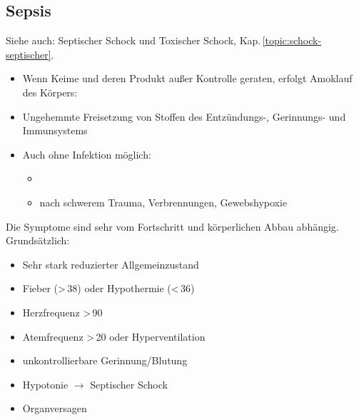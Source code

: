 


\subsection{Sepsis}
\label{topic:sepsis}

Siehe auch: Septischer Schock und Toxischer Schock,
Kap.\,\ref{topic:schock-septischer}.

\begin{itemize}
  \item Wenn Keime und deren Produkt außer Kontrolle geraten,
  erfolgt Amoklauf des Körpers:
  \item Ungehemmte Freisetzung von Stoffen des Entzündungs-, Gerinnungs-
  und Immunsystems
  \item Auch ohne Infektion möglich:
  \begin{itemize}
    \item {}
    \item nach schwerem Trauma, Verbrennungen, Gewebshypoxie
  \end{itemize}
\end{itemize}


{%
Die Symptome sind sehr vom Fortschritt und
körperlichen Abbau abhängig. Grundsätzlich:


\begin{itemize}
  \item Sehr stark reduzierter Allgemeinzustand
  \item Fieber ({\textgreater}\,38{\textcelsius}) oder
  Hypothermie ({\textless}\,36{\textcelsius})
  \item Herzfrequenz {\textgreater}\,90
  \item Atemfrequenz {\textgreater}\,20 oder
  Hyperventilation
  \item unkontrollierbare Gerinnung/Blutung
  \item Hypotonie ${\rightarrow}$ Septischer Schock
  \item Organversagen
\end{itemize}

}{}{}{}{}


